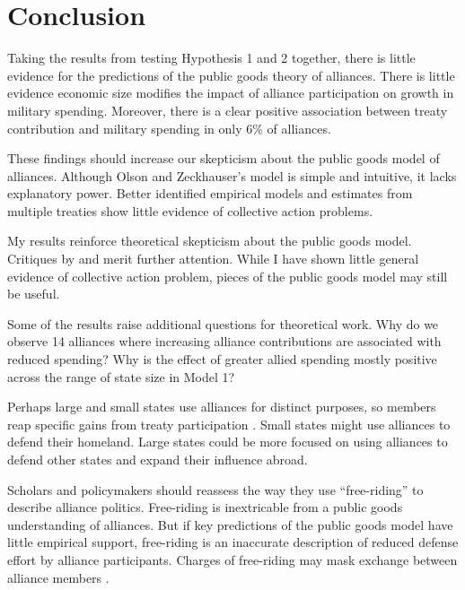 \documentclass[12pt]{article}
\begin{document}


\section{Conclusion}

Taking the results from testing Hypothesis 1 and 2 together, there is little evidence for the predictions of the public goods theory of alliances. 
There is little evidence economic size modifies the impact of alliance participation on growth in military spending.
Moreover, there is a clear positive association between treaty contribution and military spending in only 6\% of alliances. 


These findings should increase our skepticism about the public goods model of alliances. 
Although Olson and Zeckhauser's model is simple and intuitive, it lacks explanatory power. 
Better identified empirical models and estimates from multiple treaties show little evidence of collective action problems. 


My results reinforce theoretical skepticism about the public goods model. 
Critiques by \citet{Palmer1990} and \citet{SandlerHartley2001} merit further attention. 
While I have shown little general evidence of collective action problem, pieces of the public goods model may still be useful. 


Some of the results raise additional questions for theoretical work. 
Why do we observe 14 alliances where increasing alliance contributions are associated with reduced spending?
Why is the effect of greater allied spending mostly positive across the range of state size in Model 1? 


Perhaps large and small states use alliances for distinct purposes, so members reap specific gains from treaty participation \citep{Morrow1991}. 
Small states might use alliances to defend their homeland. 
Large states could be more focused on using alliances to defend other states and expand their influence abroad. 


Scholars and policymakers should reassess the way they use ``free-riding'' to describe alliance politics. 
Free-riding is inextricable from a public goods understanding of alliances.
But if key predictions of the public goods model have little empirical support, free-riding is an inaccurate description of reduced defense effort by alliance participants.  
Charges of free-riding may mask exchange between alliance members \citep{Lanoszka2015}. 
\end{document}
